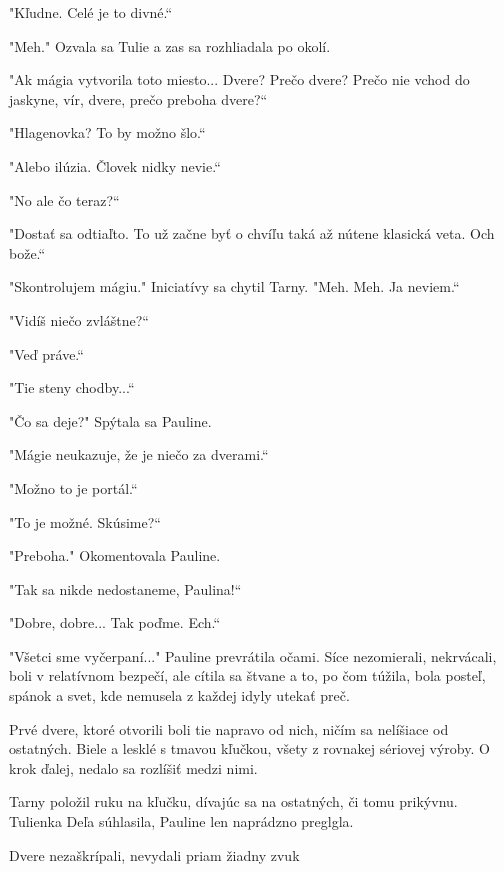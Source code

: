 \documentclass{book}
\begin{document}
"$ $Kľudne. Celé je to divné.“

"$ $Meh."$ $ Ozvala sa Tulie a zas sa rozhliadala po okolí.

"$ $Ak mágia vytvorila toto miesto... Dvere? Prečo dvere? Prečo nie vchod do jaskyne, vír, dvere, prečo preboha dvere?“

"$ $Hlagenovka? To by možno šlo.“

"$ $Alebo ilúzia. Človek nidky nevie.“

"$ $No ale čo teraz?“

"$ $Dostať sa odtiaľto. To už začne byť o chvíľu taká až nútene klasická veta. Och bože.“

"$ $Skontrolujem mágiu."$ $ Iniciatívy sa chytil Tarny. "$ $Meh. Meh. Ja neviem.“

"$ $Vidíš niečo zvláštne?“

"$ $Veď práve.“

"$ $Tie steny chodby...“

"$ $Čo sa deje?"$ $ Spýtala sa Pauline.

"$ $Mágie neukazuje, že je niečo za dverami.“

"$ $Možno to je portál.“

"$ $To je možné. Skúsime?“

"$ $Preboha."$ $ Okomentovala Pauline.

"$ $Tak sa nikde nedostaneme, Paulina!“

"$ $Dobre, dobre... Tak poďme. Ech.“

"$ $Všetci sme vyčerpaní..."$ $ Pauline prevrátila očami. Síce nezomierali, nekrvácali, boli v relatívnom bezpečí, ale cítila sa štvane a to, po čom túžila, bola posteľ, spánok a svet, kde nemusela z každej idyly utekať preč.

Prvé dvere, ktoré otvorili boli tie napravo od nich, ničím sa nelíšiace od ostatných. Biele a lesklé s tmavou kľučkou, všety z rovnakej sériovej výroby. O krok ďalej, nedalo sa rozlíšiť medzi nimi.

Tarny položil ruku na kľučku, dívajúc sa na ostatných, či tomu prikývnu. Tulienka Deľa súhlasila, Pauline len naprádzno preglgla.

Dvere nezaškrípali, nevydali priam žiadny zvuk
\end{document}
